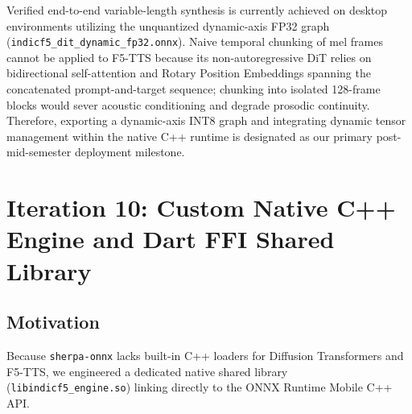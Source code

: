 Verified end-to-end variable-length synthesis is currently achieved on desktop environments utilizing the unquantized dynamic-axis FP32 graph (\texttt{indicf5\_dit\_dynamic\_fp32.onnx}). Naive temporal chunking of mel frames cannot be applied to F5-TTS because its non-autoregressive DiT relies on bidirectional self-attention and Rotary Position Embeddings spanning the concatenated prompt-and-target sequence; chunking into isolated 128-frame blocks would sever acoustic conditioning and degrade prosodic continuity. Therefore, exporting a dynamic-axis INT8 graph and integrating dynamic tensor management within the native C++ runtime is designated as our primary post-mid-semester deployment milestone.

\section{Iteration 10: Custom Native C++ Engine and Dart FFI Shared Library}
\subsection{Motivation}
Because \texttt{sherpa-onnx} lacks built-in C++ loaders for Diffusion Transformers and F5-TTS, we engineered a dedicated native shared library (\texttt{libindicf5\_engine.so}) linking directly to the ONNX Runtime Mobile C++ API.

